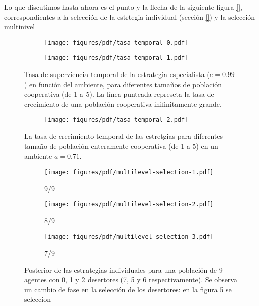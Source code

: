 \documentclass[a4paper,10pt]{article}
\begin{document}
Lo que discutimos hasta ahora es el punto y la flecha de la siguiente figura \ref{}, correspondientes a la selección de la estrtegia individual (sección \ref{}) y la selección multinivel 


\begin{figure}[H]
    \centering
    \begin{subfigure}[b]{0.66\textwidth}
    \texttt{[image: figures/pdf/tasa-temporal-0.pdf]}
    \end{subfigure}
    \caption{}
    \label{fig:fitness_temporal}
\end{figure}


\begin{figure}[H]
    \centering
    \begin{subfigure}[b]{0.66\textwidth}
    \texttt{[image: figures/pdf/tasa-temporal-1.pdf]}
    \end{subfigure}
    \caption{
    Tasa de superviencia temporal de la estrategia especialista ($e=0.99$) en función del ambiente, para diferentes tamaños de población cooperativa (de 1 a 5).
    La línea punteada represeta la tasa de crecimiento de una población cooperativa inifinitamente grande.
    }
    \label{fig:multilevel-selection-1}
\end{figure}


\begin{figure}[H]
    \centering
    \begin{subfigure}[b]{0.66\textwidth}
    \texttt{[image: figures/pdf/tasa-temporal-2.pdf]}
    \end{subfigure}
    \caption{
    La tasa de crecimiento temporal de las estretgias para diferentes tamaño de población enteramente cooperativa (de 1 a 5) en un ambiente $a=0.71$.
    }
    \label{fig:multilevel-selection-1}
\end{figure}


\begin{figure}[H]
    \centering
    \begin{subfigure}[b]{0.32\textwidth}
    \texttt{[image: figures/pdf/multilevel-selection-1.pdf]}
    \caption{9/9}
    \label{fig:multilevel-selection-1}
    \end{subfigure}
    \begin{subfigure}[b]{0.32\textwidth}
    \texttt{[image: figures/pdf/multilevel-selection-2.pdf]}
    \caption{8/9}
    \label{fig:multilevel-selection-2}
    \end{subfigure}
    \begin{subfigure}[b]{0.32\textwidth}
    \texttt{[image: figures/pdf/multilevel-selection-3.pdf]}
    \caption{7/9}
    \label{fig:multilevel-selection-3}
    \end{subfigure}
    \caption{
    Posterior de las estrategias individuales para una población de 9 agentes con 0, 1 y 2 desertores (\ref{fig:multilevel-selection-1}, \ref{fig:multilevel-selection-2} y \ref{fig:multilevel-selection-3} respectivamente).
    Se observa un cambio de fase en la selección de los desertores: en la figura \ref{fig:multilevel-selection-2} se seleccion
    }
    \label{fig:multilevel-selection-1}
\end{figure}
\end{document}
